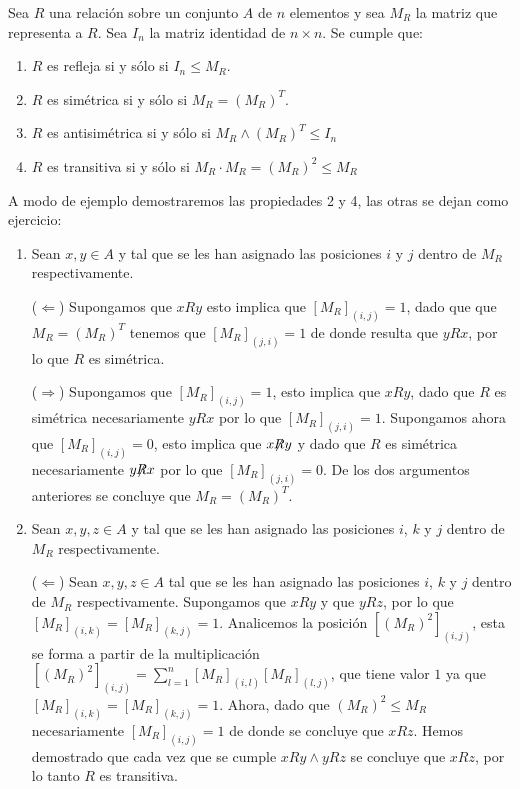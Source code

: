 \begin{teorema}
\label{teo:propiedades-matrices-relaciones}
Sea $R$ una relación sobre un conjunto $A$ de $n$ elementos y sea $M_R$ la matriz que representa a $R$.
Sea $I_n$ la matriz identidad de $n\times n$.
Se cumple que:
\begin{enumerate}
  \itemsep 0pt
  \item $R$ es refleja si y sólo si $I_n\leq M_R$.
  \item $R$ es simétrica si y sólo si $M_R=(M_R)^T$.
  \item $R$ es antisimétrica si y sólo si $M_R\wedge (M_R)^T\leq I_n$
  \item $R$ es transitiva si y sólo si $M_R\cdot M_R=(M_R)^2\leq M_R$
\end{enumerate}
\begin{demostracion}
A modo de ejemplo demostraremos las propiedades 2 y 4, las otras se dejan como ejercicio:
\begin{enumerate}
  \itemsep 0pt
  \item Sean $x,y\in A$ y tal que se les han asignado las posiciones $i$ y $j$ dentro de $M_R$ respectivamente.
  
  ($\Leftarrow$) Supongamos que $xRy$ esto implica que $[M_R]_{(i,j)}=1$, dado que que $M_R=(M_R)^T$ tenemos que $[M_R]_{(j,i)}=1$ de donde resulta que $yRx$, por lo que $R$ es simétrica.
  
  ($\Rightarrow$) Supongamos que $[M_R]_{(i,j)}=1$, esto implica que $xRy$, dado que $R$ es simétrica necesariamente $yRx$ por lo que $[M_R]_{(j,i)}=1$. 
  Supongamos ahora que $[M_R]_{(i,j)}=0$, esto implica que $x\hspace*{-0.3em}\not\hspace*{-0.3em}Ry$ y dado que $R$ es simétrica necesariamente $y\hspace*{-0.3em}\not\hspace*{-0.3em}Rx$ por lo que $[M_R]_{(j,i)}=0$.
  De los dos argumentos anteriores se concluye que $M_R=(M_R)^T$.
  
  \item Sean $x,y,z\in A$ y tal que se les han asignado las posiciones $i$, $k$ y $j$ dentro de $M_R$ respectivamente.
  
  ($\Leftarrow$) Sean $x,y,z\in A$ tal que se les han asignado las posiciones $i$, $k$ y $j$ dentro de $M_R$ respectivamente.
  Supongamos que $xRy$ y que $yRz$, por lo que $[M_R]_{(i,k)}=[M_R]_{(k,j)}=1$.
  Analicemos la posición $[(M_R)^2]_{(i,j)}$, esta se forma a partir de la multiplicación $[(M_R)^2]_{(i,j)}=\sum_{l=1}^n[M_R]_{(i,l)}[M_R]_{(l,j)}$, que tiene valor $1$ ya que $[M_R]_{(i,k)}=[M_R]_{(k,j)}=1$.
  Ahora, dado que $(M_R)^2\leq M_R$ necesariamente $[M_R]_{(i,j)}=1$ de donde se concluye que $xRz$.
  Hemos demostrado que cada vez que se cumple $xRy \wedge yRz$ se concluye que $xRz$, por lo tanto $R$ es transitiva.
  

\end{enumerate}
\end{demostracion}
\end{teorema}
